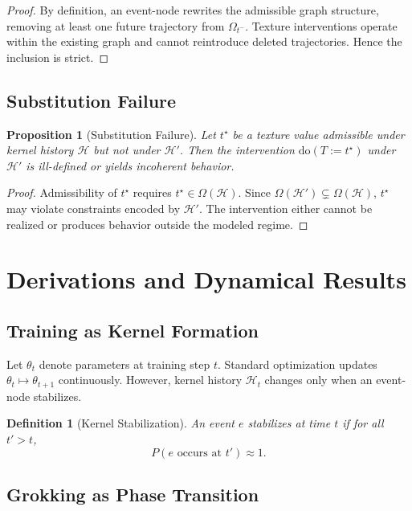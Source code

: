 \documentclass[11pt]{article}
\newtheorem{definition}{Definition}
\newtheorem{proposition}{Proposition}
\theoremstyle{remark}
\newcommand{\Hist}{\mathcal{H}}
\newcommand{\Do}{\mathrm{do}}
\begin{document}
\begin{proof}
By definition, an event-node rewrites the admissible graph structure,
removing at least one future trajectory from $\Omega_{t^-}$. Texture
interventions operate within the existing graph and cannot reintroduce
deleted trajectories. Hence the inclusion is strict.
\end{proof}

\subsection{Substitution Failure}

\begin{proposition}[Substitution Failure]
Let $t^\star$ be a texture value admissible under kernel history
$\Hist$ but not under $\Hist'$. Then the intervention
$\Do(T := t^\star)$ under $\Hist'$ is ill-defined or yields incoherent
behavior.
\end{proposition}

\begin{proof}
Admissibility of $t^\star$ requires $t^\star \in \Omega(\Hist)$. Since
$\Omega(\Hist') \subsetneq \Omega(\Hist)$, $t^\star$ may violate
constraints encoded by $\Hist'$. The intervention either cannot be
realized or produces behavior outside the modeled regime.
\end{proof}

\section{Derivations and Dynamical Results}

\subsection{Training as Kernel Formation}

Let $\theta_t$ denote parameters at training step $t$. Standard
optimization updates $\theta_t \mapsto \theta_{t+1}$ continuously.
However, kernel history $\Hist_t$ changes only when an event-node
stabilizes.

\begin{definition}[Kernel Stabilization]
An event $e$ stabilizes at time $t$ if for all $t' > t$,
\[
P(e \text{ occurs at } t') \approx 1.
\]
\end{definition}

\subsection{Grokking as Phase Transition}
\end{document}
